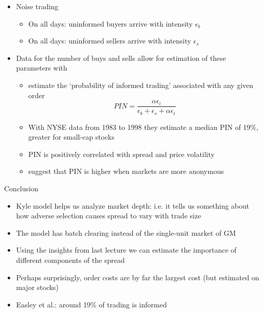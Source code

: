 \documentclass[english,10pt]{beamer}
\begin{document}
\begin{frame}{}
	\begin{itemize}
		\item Noise trading
		\begin{itemize}
			\item On all days: uninformed buyers arrive with intensity $\epsilon_b$
			\item On all days: uninformed sellers arrive with intensity $\epsilon_s$
		\end{itemize}
		\item Data for the number of buys and sells allow for estimation of these parameters with 
		\begin{itemize}
			\item \citet*{easley_is_2002} estimate the `probability of informed trading' associated with any given order
			\begin{equation} \tag{5.27}
			PIN = \frac{\alpha \epsilon_i}{\epsilon_b + \epsilon_s + \alpha \epsilon_i}
			\end{equation}
			\item With NYSE data from 1983 to 1998 they estimate a median PIN of 19\%, greater for small-cap stocks
			\item PIN is positively correlated with  spread and price volatility
			\item \citet*{grammig_knowing_2001} suggest that PIN is higher when markets are more anonymous
		\end{itemize}
	\end{itemize}
\end{frame}


\begin{frame}{Conclusion}
	\begin{itemize}
		\item Kyle model helps us analyze market depth: i.e. it tells us something about how adverse selection causes spread to vary with trade size
		\item The model has batch clearing instead of the single-unit market of GM
		\item Using the insights from last lecture we can estimate the importance of different components of the spread
		\item Perhaps surprisingly, order costs are by far the largest cost (but estimated on major stocks)
		\item Easley et al.: around 19\% of trading is informed
	\end{itemize}
\end{frame}
\end{document}
